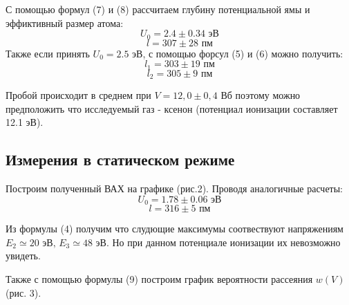 \documentclass[a4paper, 12pt]{article}
\begin{document}
С помощью формул (7) и (8) рассчитаем глубину потенциальной ямы и эффиктивный размер атома:
$$
U_0 = 2.4 \pm 0.34 \text{ эВ}
$$$$
l = 307 \pm 28 \text{ пм}
$$
Также если принять $U_0 = 2.5 \text{ эВ}$, с помощью форсул (5) и (6) можно получить:
$$
l_1 = 303 \pm 19 \text{ пм}
$$$$
l_2 = 305 \pm 9 \text{ пм}
$$

Пробой происходит в среднем при $V = 12,0 \pm 0,4 \text{ В}$б поэтому можно предположить что исследуемый газ - ксенон (потенциал ионизации составляет 12.1 эВ).

\subsection{Измерения в статическом режиме}


Построим полученный ВАХ на графике (рис.2). Проводя аналогичные расчеты:
$$
U_0 = 1.78 \pm 0.06 \text{ эВ}
$$$$
l = 316 \pm 5 \text{ пм}
$$

Из формулы (4) получим что слудющие максимумы соотвествуют напряжениям $E_2 \simeq 20 \text{ эВ, }E_3 \simeq 48 \text{ эВ}$. Но при данном потенциале ионизации их невозможно увидеть.

Также с помощью формулы (9) построим график вероятности рассеяния $w(V)$ (рис. 3).

\newpage
\end{document}
